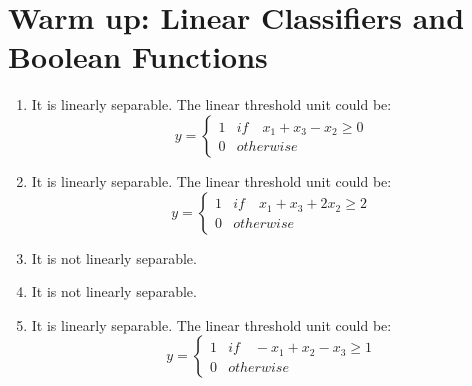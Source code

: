 \documentclass{article}
\begin{document}
	\section{Warm up: Linear Classifiers and Boolean Functions}
		\begin{enumerate}
			\item It is linearly separable. The linear threshold unit could be:
			\begin{equation}
				y = \left\{ \begin{array}{ll}
					1 & if \quad x_1 + x_3 - x_2 \geq 0 \\
					0 & otherwise \end{array} \right.
			\end{equation}
			\item It is linearly separable. The linear threshold unit could be:
			\begin{equation}
				y = \left\{ \begin{array}{ll}
					1 & if \quad x_1 + x_3 + 2x_2 \geq 2 \\
					0 & otherwise \end{array} \right.
			\end{equation}
			\item It is not linearly separable.
			\item It is not linearly separable.
			\item It is linearly separable. The linear threshold unit could be:
			\begin{equation}
				y = \left\{ \begin{array}{ll}
					1 & if \quad -x_1+x_2-x_3\geq 1 \\
					0 & otherwise \end{array} \right.
			\end{equation}
		\end{enumerate}
\end{document}
